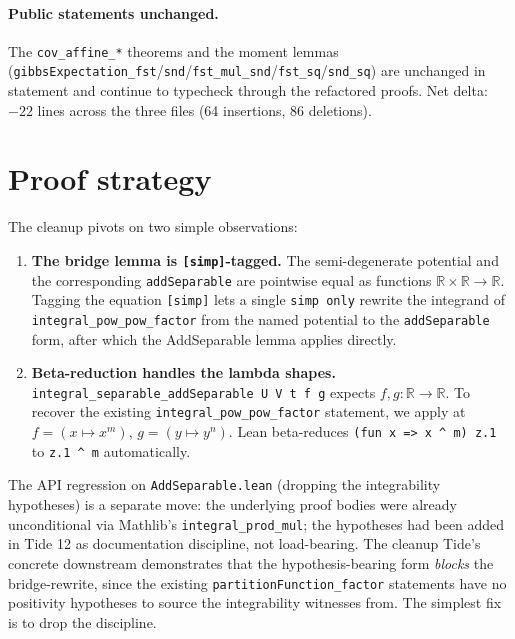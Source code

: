 \documentclass[11pt]{article}
\begin{document}
\paragraph{Public statements unchanged.} The \texttt{cov\_affine\_*}
theorems and the moment lemmas
(\texttt{gibbsExpectation\_fst}/\texttt{snd}/\texttt{fst\_mul\_snd}/\texttt{fst\_sq}/\texttt{snd\_sq})
are unchanged in statement and continue to typecheck through the
refactored proofs. Net delta: $-22$ lines across the three files (64
insertions, 86 deletions).

\section{Proof strategy}

The cleanup pivots on two simple observations:

\begin{enumerate}
\item \textbf{The bridge lemma is \texttt{[simp]}-tagged.}
  The semi-degenerate potential and the corresponding
  \texttt{addSeparable} are pointwise equal as functions $\mathbb{R}
  \times \mathbb{R} \to \mathbb{R}$. Tagging the equation
  \texttt{[simp]} lets a single \texttt{simp only} rewrite the
  integrand of \texttt{integral\_pow\_pow\_factor} from the named
  potential to the \texttt{addSeparable} form, after which the
  AddSeparable lemma applies directly.
\item \textbf{Beta-reduction handles the lambda shapes.}
  \texttt{integral\_separable\_addSeparable U V t f g} expects $f, g :
  \mathbb{R} \to \mathbb{R}$. To recover the existing
  \texttt{integral\_pow\_pow\_factor} statement, we apply at $f = (x
  \mapsto x^m)$, $g = (y \mapsto y^n)$. Lean beta-reduces \texttt{(fun
  x => x ^ m) z.1} to \texttt{z.1 ^ m} automatically.
\end{enumerate}

The API regression on \texttt{AddSeparable.lean} (dropping the
integrability hypotheses) is a separate move: the underlying proof
bodies were already unconditional via Mathlib's
\texttt{integral\_prod\_mul}; the hypotheses had been added in Tide 12
as documentation discipline, not load-bearing. The cleanup Tide's
concrete downstream demonstrates that the hypothesis-bearing form
\emph{blocks} the bridge-rewrite, since the existing
\texttt{partitionFunction\_factor} statements have no positivity
hypotheses to source the integrability witnesses from. The simplest
fix is to drop the discipline.
\end{document}
